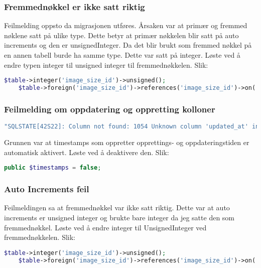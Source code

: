 \subsubsection{Fremmednøkkel er ikke satt riktig}
Feilmelding oppsto da migrasjonen utføres. 
Årsaken var at primær og fremmed nøklene satt på ulike type.
Dette betyr at primær nøkkelen blir satt på auto increments og den er unsignedInteger. Da det blir brukt som fremmed nøkkel på en annen tabell burde ha samme type. Dette var satt på integer.
Løste ved å endre typen integer til unsigned integer til fremmednøkkelen. Slik:

\begin{lstlisting}[language=PHP]
    $table->integer('image_size_id')->unsigned();
    $table->foreign('image_size_id')->references('image_size_id')->on('image_sizes');
\end{lstlisting}

\subsubsection{Feilmelding om oppdatering og oppretting kolloner}
\begin{lstlisting}[language=PHP]
    "SQLSTATE[42S22]: Column not found: 1054 Unknown column 'updated_at' in 'field list' (SQL: insert into `image_sizes` (`name`, `max_width`, `max_height`, `id`, `updated_at`, `created_at`) values (size-name, 10, 20, 879d1360-9a74-46f8-b383-ff6ec6e0f387, 2019-02-07 21:08:09, 2019-02-07 21:08:09))
\end{lstlisting}
Grunnen var at timestamps som oppretter opprettings- og oppdateringstiden er automatisk aktivert.
Løste ved å deaktivere den. Slik: 

\begin{lstlisting}[language=PHP]
    public $timestamps = false;
\end{lstlisting}

\subsubsection{Auto Increments feil}
Feilmeldingen sa at fremmednøkkel var ikke satt riktig.
Dette var at auto increments er unsigned integer og brukte bare integer da jeg satte den som fremmednøkkel.
Løste ved å endre integer til UnsignedInteger ved fremmednøkkelen. Slik:

\begin{lstlisting}[language=PHP]
    $table->integer('image_size_id')->unsigned();
    $table->foreign('image_size_id')->references('image_size_id')->on('image_sizes');
\end{lstlisting}

